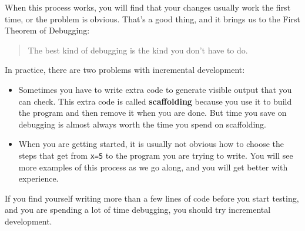 \documentclass[12pt]{book}
\theoremstyle{exercise}
\begin{document}
When this process works, you will find that your changes usually
work the first time, or the problem is obvious.  That's a good thing,
and it brings us to the First Theorem of Debugging:

\begin{quote}
The best kind of debugging is the kind you don't have to do.
\end{quote}

In practice, there are two problems with incremental development:

\begin{itemize}

\item Sometimes you have to write extra code to
generate visible output that you can check.  This extra code is
called {\bf scaffolding} because you use it to build the program
and then remove it when you are done.  But time you save on
debugging is almost always worth the time you spend on
scaffolding.

\item When you are getting started, it is usually not obvious how to
choose the steps that get from {\tt x=5} to the program you are trying
to write.  You will see more examples of this process as we go along, and you will get better with experience.

\end{itemize}

If you find yourself writing more than a few lines of code before
you start testing, and you are spending a lot of time debugging,
you should try incremental development.







\backmatter
\printindex
\end{document}
